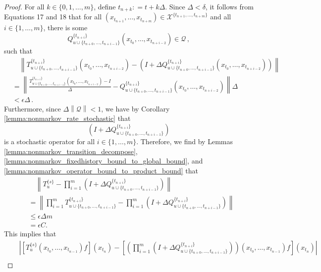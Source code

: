 \documentclass[a4paper,reqno]{amsart}
\newcommand{\states}{\mathcal{X}}
\newcommand{\norm}[1]{\left\lVert #1 \right\rVert}
\newcommand{\coloneqq}{:\!=}
\begin{document}
\begin{proof}
For all $k\in\{0,1,\ldots,m\}$, define $t_{n+k}\coloneqq t+k\Delta$. Since $\Delta<\delta$, it follows from Equations 17 and 18 that for all $(x_{t_{n+1}},\ldots,x_{t_{n+m}})\in\states^{\{t_{n+1},\ldots,t_{n+m}\}}$ and all $i\in\{1,\ldots,m\}$, there is some
\begin{equation*}
Q_{u\cup\{t_{n+0},\ldots,t_{n+i-1}\}}^{\{t_{n+i}\}}(x_{t_0},\ldots,x_{t_{n+i-2}})\in\mathcal{Q}\,,
\end{equation*}
such that
\begin{align*}
&\quad \norm{T_{u\cup\{t_{n+0},\ldots,t_{n+i-1}\}}^{\{t_{n+i}\}}(x_{t_0},\ldots,x_{t_{n+i-2}}) - \left(I + \Delta Q_{u\cup\{t_{n+0},\ldots,t_{n+i-1}\}}^{\{t_{n+i}\}}(x_{t_0},\ldots,x_{t_{n+i-2}})\right)} \\
 &= \norm{\frac{T_{u\cup\{t_{n+0},\ldots,t_{n+i-1}\}}^{\{t_{n+i}\}}(x_{t_0},\ldots,x_{t_{n+i-2}}) - I}{\Delta} - Q_{u\cup\{t_{n+0},\ldots,t_{n+i-1}\}}^{\{t_{n+i}\}}(x_{t_0},\ldots,x_{t_{n+i-2}})}\Delta \\
 &<\epsilon\Delta\,.
\end{align*}
Furthermore, since $\Delta\norm{\mathcal{Q}}<1$, we have by Corollary \ref{lemma:nonmarkov_rate_stochastic} that
\begin{equation*}
\left(I + \Delta Q_{u\cup\{t_{n+0},\ldots,t_{n+i-1}\}}^{\{t_{n+i}\}}\right)
\end{equation*}
is a stochastic operator for all $i\in\{1,\ldots,m\}$. Therefore, we find by Lemmas \ref{lemma:nonmarkov_transition_decompose}, \ref{lemma:nonmarkov_fixedhistory_bound_to_global_bound}, and \ref{lemma:nonmarkov_operator_bound_to_product_bound} that
\begin{align*}
&\quad \norm{T_u^{\{s\}} - \prod_{i=1}^m\left(I + \Delta Q_{u\cup\{t_{n+0},\ldots,t_{n+i-1}\}}^{\{t_{n+i}\}}\right)} \\
&= \norm{\prod_{i=1}^m T_{u\cup\{t_{n+0},\ldots,t_{n+i-1}\}}^{\{t_{n+i}\}} - \prod_{i=1}^m\left(I + \Delta Q_{u\cup\{t_{n+0},\ldots,t_{n+i-1}\}}^{\{t_{n+i}\}}\right)} \\
&\leq \epsilon\Delta m \\
&= \epsilon C.
\end{align*}
This implies that
\begin{align*}
&\quad\left\vert \left[T_{u}^{\{s\}}(x_{t_0},\ldots,x_{t_{n-1}})f\right](x_{t_n}) - \left[\left(\prod_{i=1}^m\left(I + \Delta Q_{u\cup\{t_{n+0},\ldots,t_{n+i-1}\}}^{\{t_{n+i}\}}\right)\right)(x_{t_0},\ldots,x_{t_{n-1}})f\right](x_{t_n})\right\vert \\

\end{align*}
\end{proof}
\end{document}
